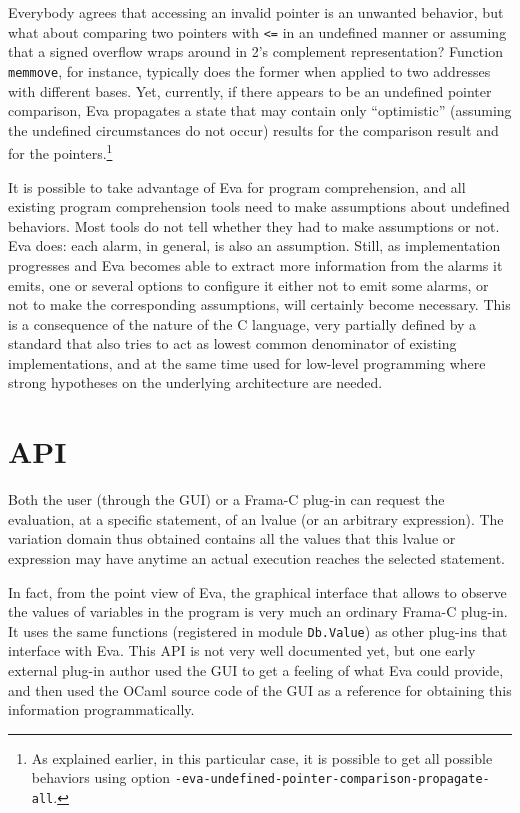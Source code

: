 \documentclass[web]{frama-c-book}
\newcommand{\Eva}{\textsf{Eva}}
\begin{document}
Everybody agrees that accessing an invalid pointer is an unwanted behavior,
but what about comparing two pointers with \lstinline|<=| in an undefined manner or 
assuming that a signed overflow wraps around in 2's complement
representation? Function \lstinline|memmove|, for instance, typically does the
former when applied to two addresses with different bases.
%
Yet, currently, if there appears to be an undefined pointer comparison, \Eva{}
propagates a state that may contain only ``optimistic''
(assuming the undefined circumstances do not occur) results
for the comparison result and for the pointers.\footnote{As explained earlier, in this particular case, it is
possible to get all possible behaviors using option 
\lstinline|-eva-undefined-pointer-comparison-propagate-all|.}

It is possible to take advantage of \Eva{}
for program comprehension, and all existing program comprehension
tools need to make assumptions about undefined behaviors. Most tools
do not tell whether they had to make assumptions or not.
\Eva{} does: each alarm, in general,
is also an assumption. Still, as implementation progresses 
and \Eva{}
becomes able to extract more information from the alarms it emits,
one or several options
to configure it either not to emit some alarms, or not 
to make the corresponding
assumptions, will certainly become necessary. This is a consequence
of the nature of the C language, very partially defined by a standard
that also tries to act as lowest common denominator of existing
implementations, and at the same time used for low-level programming
where strong hypotheses on the underlying architecture are needed.


\section{API}

Both the user (through the GUI) or a Frama-C plug-in can 
request the evaluation,
at a specific statement, of an lvalue (or an arbitrary expression). 
The variation domain thus obtained
contains all the values that this lvalue or expression may
have anytime an actual execution reaches the selected statement.

In fact, from the point view of \Eva{}, the graphical interface
that allows to observe the values of variables in the program is very much
an ordinary Frama-C plug-in. It uses the same functions (registered 
in module \lstinline|Db.Value|) as other plug-ins that interface with
\Eva{}.
This API is not very well documented yet, but one early external
plug-in author used the GUI to get a feeling of what \Eva{}
could provide, and then used the OCaml source code of the GUI as
a reference for obtaining this information programmatically.
\end{document}
